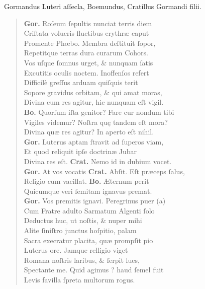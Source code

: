 \documentclass[a4paper,12pt]{article}
\begin{document}
Gormandus Luteri aſſecla, Boemundus, Cratillus Gormandi filii.
\begin{verse}
\textbf{Gor.} Roſeum ſepultis nunciat terris diem\\[0pt]
Criſtata volucris fluctibus erythræ caput\\[0pt]
Promente Phœbo. Membra deſtituit ſopor,\\[0pt]
Repetitque terras dura curarum Cohors.\\[0pt]
Vos uſque ſomnus urget, \& nunquam ſatis\\[0pt]
Excutitis oculis noctem. Inoffenſos refert\\[0pt]
Difficilè greſſus arduam quiſquis terit\\[0pt]
Sopore gravidus orbitam, \& qui amat moras,\\[0pt]
Divina cum res agitur, hic nunquam eſt vigil.\\[0pt]
\textbf{Bo.} Quorſum iſta genitor? Fare cur nondum tibi\\[0pt]
Vigiles videmur? Noſtra quę tandem eſt mora?\\[0pt]
Divina quæ res agitur? In aperto eſt nihil.\\[0pt]
\textbf{Gor.} Luterus aptam ſtravit ad ſuperos viam,\\[0pt]
Et quod reliquit ipſe doctrinæ Jubar\\[0pt]
Divina res eſt. \textbf{Crat.} Nemo id in dubium vocet.\\[0pt]
\textbf{Gor.} At vos vocatis \textbf{Crat.} Abſit. Eſt præceps ſalus,\\[0pt]
Religio cum vacillat. \textbf{Bo.} Æternum perit\\[0pt]
Quicumque veri ſemitam ignavus premat.\\[0pt]
\textbf{Gor.} Vos premitis ignavi. Peregrinus puer (a)\footnotemark\\[0pt]
Cum Fratre adulto Sarmatum Algenti ſolo\\[0pt]
Deductus huc, ut noſtis, \& nuper mihi\\[0pt]
Alite ſiniſtro junctus hoſpitio, palam\\[0pt]
Sacra execratur placita, quæ prompſit pio\\[0pt]
Luterus ore. Jamque relligio viget\\[0pt]
Romana noſtris laribus, \& ſerpit lues,\\[0pt]
Spectante me. Quid agimus ? haud ſemel fuit\\[0pt]
Levis favilla ſpreta multorum rogus.\\[0pt]

\end{verse}
\end{document}
